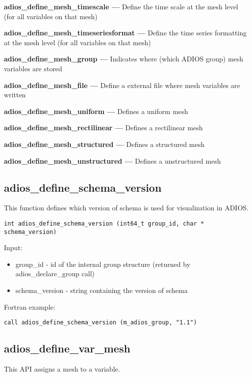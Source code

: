\textbf{adios\_define\_mesh\_timescale ---} Define the time scale at the mesh level (for all variables on that mesh)

\textbf{adios\_define\_mesh\_timeseriesformat ---} Define the time series formatting at the mesh level (for all variables on that mesh)

\textbf{adios\_define\_mesh\_group ---} Indicates where (which ADIOS group) mesh variables are stored

\textbf{adios\_define\_mesh\_file ---} Define a external file where mesh variables are written

\textbf{adios\_define\_mesh\_uniform ---} Defines a uniform mesh

\textbf{adios\_define\_mesh\_rectilinear ---} Defines a rectilinear mesh

\textbf{adios\_define\_mesh\_structured ---} Defines a structured mesh

\textbf{adios\_define\_mesh\_unstructured ---} Defines a unstructured mesh

\subsection{adios\_define\_schema\_version}
This function defines which version of schema is used for visualization in ADIOS.

\begin{lstlisting}[alsolanguage=C,caption={},label={}]
int adios_define_schema_version (int64_t group_id, char * schema_version)
\end{lstlisting}

Input:
\begin{itemize}
\item group\_id - id of the internal group structure (returned by adios\_declare\_group call)
\item schema\_version - string containing the version of schema
\end{itemize}

Fortran example:
\begin{lstlisting}[alsolanguage=Fortran,caption={},label={}]
call adios_define_schema_version (m_adios_group, "1.1")
\end{lstlisting}


\subsection{adios\_define\_var\_mesh}
This API assigns a mesh to a variable.

